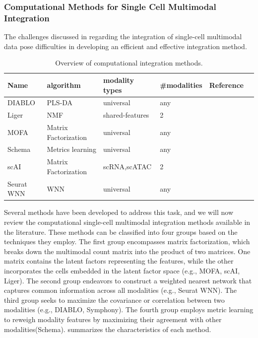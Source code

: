 \subsubsection{Computational Methods for Single Cell Multimodal Integration}
\label{background:sec2:integration}
The challenges discussed in  regarding the integration of single-cell multimodal data pose difficulties in developing an efficient and effective integration method.

\begin{table}[!ht]
	\small
	\centering
	\begin{tabular}{llllll}
		\toprule
		Name & algorithm & modality types & \#modalities & Reference \\
		\midrule
    DIABLO & PLS-DA & universal & any & \cite{singh2019diablo}\\
    Liger & NMF & shared-features& 2 & \cite{kriebel2021nonnegative} \\
		MOFA   &  Matrix Factorization & universal & any &  \cite{argelaguet2020mofa+} \\
		Schema & Metrics learning  & universal & any & \cite{singh2021schema} \\
    scAI & Matrix Factorization & scRNA,scATAC & 2 & \cite{jin2020scai}\\
		Seurat WNN	 & WNN & universal & any & \cite{hao2021seurat4} \\
		\bottomrule
	\end{tabular}
	\vspace{0.1cm}
	\caption[Overview of computational integration methods]{Overview of computational integration methods.}
	\label{tab:methods_integration_overview}
\end{table}

Several methods have been developed to address this task, and we will now review the computational single-cell multimodal integration methods available in the literature. These methods can be classified into four groups based on the techniques they employ. The first group encompasses matrix factorization, which breaks down the multimodal count matrix into the product of two matrices. One matrix contains the latent factors representing the features, while the other incorporates the cells embedded in the latent factor space (e.g., MOFA, scAI, Liger). The second group endeavors to construct a weighted nearest network that captures common information across all modalities (e.g., Seurat WNN). The third group seeks to maximize the covariance or correlation between two modalities (e.g., DIABLO, Symphony). The fourth group employs metric learning to reweigh modality features by maximizing their agreement with other modalities(Schema).  summarizes the characteristics of each method.

